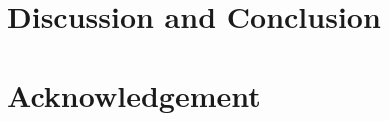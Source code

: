 \documentclass{aastex631}
\begin{document}
\section{Discussion and Conclusion}\label{sec:conclusion}


\section{Acknowledgement}\label{sec:acknowledgement}






\appendix

\end{document}
